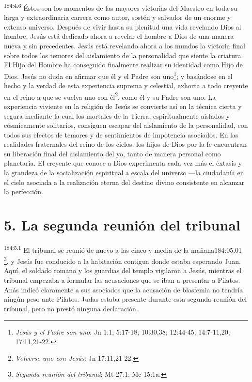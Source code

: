 \par 
\textsuperscript{184:4.6} Éstos son los momentos de las mayores victorias del Maestro en toda su larga y extraordinaria carrera como autor, sostén y salvador de un enorme y extenso universo. Después de vivir hasta su plenitud una vida revelando Dios al hombre, Jesús está dedicado ahora a revelar el hombre a Dios de una manera nueva y sin precedentes. Jesús está revelando ahora a los mundos la victoria final sobre todos los temores del aislamiento de la personalidad que siente la criatura. El Hijo del Hombre ha conseguido finalmente realizar su identidad como Hijo de Dios. Jesús no duda en afirmar que él y el Padre son uno\footnote{\textit{Jesús y el Padre son uno}: Jn 1:1; 5:17-18; 10:30,38; 12:44-45; 14:7-11,20; 17:11,21-22.}; y basándose en el hecho y la verdad de esta experiencia suprema y celestial, exhorta a todo creyente en el reino a que se vuelva uno con él\footnote{\textit{Volverse uno con Jesús}: Jn 17:11,21-22.}, como él y su Padre son uno. La experiencia viviente en la religión de Jesús se convierte así en la técnica cierta y segura mediante la cual los mortales de la Tierra, espiritualmente aislados y cósmicamente solitarios, consiguen escapar del aislamiento de la personalidad, con todos sus efectos de temores y de sentimientos de impotencia asociados. En las realidades fraternales del reino de los cielos, los hijos de Dios por la fe encuentran su liberación final del aislamiento del yo, tanto de manera personal como planetaria. El creyente que conoce a Dios experimenta cada vez más el éxtasis y la grandeza de la socialización espiritual a escala del universo ---la ciudadanía en el cielo asociada a la realización eterna del destino divino consistente en alcanzar la perfección.

\section*{5. La segunda reunión del tribunal}
\par 
\textsuperscript{184:5.1} El tribunal se reunió de nuevo a las cinco y media de la mañana184:05.01 \footnote{\textit{Segunda reunión del tribunal}: Mt 27:1; Mc 15:1a.}, y Jesús fue conducido a la habitación contigua donde estaba esperando Juan. Aquí, el soldado romano y los guardias del templo vigilaron a Jesús, mientras el tribunal empezaba a formular las acusaciones que se iban a presentar a Pilatos. Anás indicó claramente a sus asociados que la acusación de blasfemia no tendría ningún peso ante Pilatos. Judas estaba presente durante esta segunda reunión del tribunal, pero no prestó ninguna declaración.


